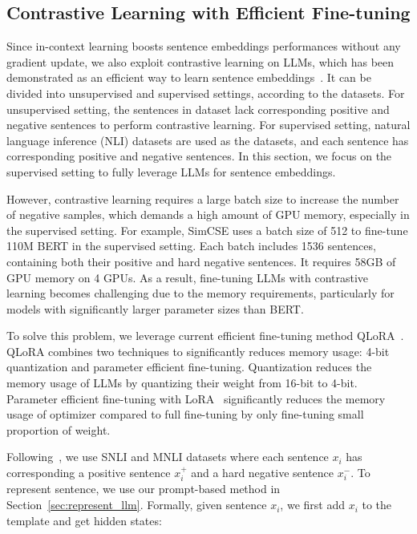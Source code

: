 \documentclass{article}
\begin{document}
\subsection{Contrastive Learning with Efficient Fine-tuning}
\label{sec:contrastive_method}

Since in-context learning boosts sentence embeddings performances  without any gradient update,
we also exploit contrastive learning on LLMs, which has been demonstrated as an efficient way to learn sentence embeddings~\cite{gao2021simcse}.
It can be divided into unsupervised and supervised settings, according to the datasets.
For unsupervised setting, the sentences in dataset lack corresponding positive and negative sentences to perform contrastive learning.
For supervised setting, natural language inference (NLI) datasets are used as the datasets, and each sentence has corresponding positive and negative sentences.
In this section, we focus on the supervised setting to fully leverage LLMs for sentence embeddings.

However, contrastive learning requires a large batch size to increase the number of negative samples, which demands a high amount of GPU memory, especially in the supervised setting.
For example, SimCSE uses a batch size of 512 to fine-tune 110M BERT in the supervised setting. Each batch includes 1536 sentences, containing both their positive and hard negative sentences. It requires 58GB of GPU memory on 4 GPUs.
As a result, fine-tuning LLMs with contrastive learning becomes challenging due to the memory requirements, particularly for models with significantly larger parameter sizes than BERT.

To solve this problem, we leverage current efficient fine-tuning method QLoRA~\cite{dettmers2023qlora}.
QLoRA combines two techniques to significantly reduces memory usage: 4-bit quantization and parameter efficient fine-tuning.
Quantization reduces the memory usage of LLMs by quantizing their weight from 16-bit to 4-bit.
Parameter efficient fine-tuning with LoRA~\cite{hu2021lora} significantly reduces the memory usage of optimizer compared to full fine-tuning by only fine-tuning small proportion of weight.

Following~\cite{gao2021simcse}, we use SNLI and MNLI datasets where each sentence $x_i$ has corresponding a positive sentence $x_i^{+}$ and a hard negative sentence $x_i^{-}$. To represent sentence, we use our prompt-based method in Section~\ref{sec:represent_llm}.
Formally, given sentence $x_i$, we first add $x_i$ to the template and get hidden states:
\end{document}
